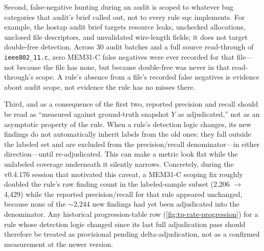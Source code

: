 Second, false-negative hunting during an audit is scoped to whatever
bug categories that audit's brief called out, not to every rule sqc
implements. For example, the hostap audit brief targets resource
leaks, unchecked allocations, unclosed file descriptors, and
unvalidated wire-length fields; it does not target double-free
detection. Across 30 audit batches and a full source read-through of
\texttt{ieee802\_11.c}, zero MEM31-C false negatives were ever
recorded for that file---not because the file has none, but because
double-free was never in that read-through's scope. A rule's absence
from a file's recorded false negatives is evidence about audit scope,
not evidence the rule has no misses there.

Third, and as a consequence of the first two, reported precision and
recall should be read as ``measured against ground-truth snapshot $Y$
as adjudicated,'' not as an asymptotic property of the rule. When a
rule's detection logic changes, its new findings do not automatically
inherit labels from the old ones: they fall outside the labeled set
and are excluded from the precision/recall denominator---in either
direction---until re-adjudicated. This can make a metric look flat
while the unlabeled coverage underneath it silently narrows. Concretely,
during the v0.4.176 session that motivated this caveat, a MEM31-C
scoping fix roughly doubled the rule's raw finding count in the
labeled-sample subset (2,206 $\to$ 4,429) while the reported
precision/recall for that rule appeared unchanged, because none of the
$\sim$2,244 new findings had yet been adjudicated into the denominator.
Any historical progression-table row (\cref{fig:tp-rate-progression})
for a rule whose detection logic changed since its last full
adjudication pass should therefore be treated as provisional pending
delta-adjudication, not as a confirmed measurement at the newer
version.
